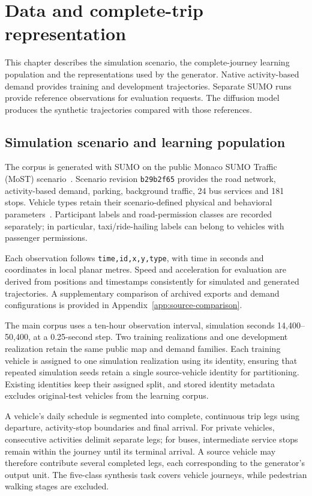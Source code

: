 \chapter{Data and complete-trip representation}
\label{ch:native-data}

This chapter describes the simulation scenario, the complete-journey learning population and the representations used by the generator. Native activity-based demand provides training and development trajectories. Separate SUMO runs provide reference observations for evaluation requests. The diffusion model produces the synthetic trajectories compared with those references.

\section{Simulation scenario and learning population}
\label{sec:expanded-native-data}
The corpus is generated with SUMO on the public Monaco SUMO Traffic (MoST) scenario~\cite{most,sumodocs}. Scenario revision \texttt{b29b2f65} provides the road network, activity-based demand, parking, background traffic, 24 bus services and 181 stops. Vehicle types retain their scenario-defined physical and behavioral parameters~\cite{sumovtypes}. Participant labels and road-permission classes are recorded separately; in particular, taxi/ride-hailing labels can belong to vehicles with passenger permissions.

Each observation follows \texttt{time,id,x,y,type}, with time in seconds and coordinates in local planar metres. Speed and acceleration for evaluation are derived from positions and timestamps consistently for simulated and generated trajectories. A supplementary comparison of archived exports and demand configurations is provided in Appendix~\ref{app:source-comparison}.

The main corpus uses a ten-hour observation interval, simulation seconds 14,400--50,400, at a 0.25-second step. Two training realizations and one development realization retain the same public map and demand families. Each training vehicle is assigned to one simulation realization using its identity, ensuring that repeated simulation seeds retain a single source-vehicle identity for partitioning. Existing identities keep their assigned split, and stored identity metadata excludes original-test vehicles from the learning corpus.

A vehicle's daily schedule is segmented into complete, continuous trip legs using departure, activity-stop boundaries and final arrival. For private vehicles, consecutive activities delimit separate legs; for buses, intermediate service stops remain within the journey until its terminal arrival. A source vehicle may therefore contribute several completed legs, each corresponding to the generator's output unit. The five-class synthesis task covers vehicle journeys, while pedestrian walking stages are excluded.

